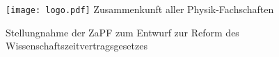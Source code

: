 \documentclass[DIV=calc]{scrartcl}
\newif\ifcomments
\renewcommand{\comment}[1]{{\ifcomments{\color{red} {#1}}{}\fi}\xspace}
\begin{document}
\hspace{0.87\textwidth}
\begin{minipage}{120pt}
\vspace{-1.8cm}
\texttt{[image: logo.pdf]}
\centering
	\small Zusammenkunft aller Physik-Fachschaften
\end{minipage}

\begin{center}
  \huge{Stellungnahme der ZaPF zum Entwurf zur Reform des Wissenschaftszeitvertragsgesetzes}\vspace{.25\baselineskip}\\
  \normalsize
\end{center}
\vspace{1cm}

    
\end{document}
